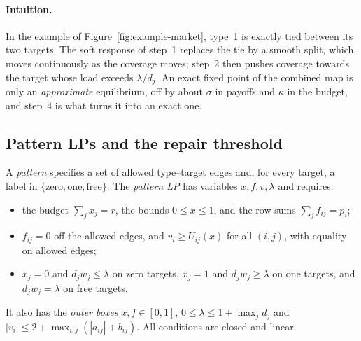 \paragraph{Intuition.} In the example of Figure~\ref{fig:example-market}, type~1 is exactly tied between
its two targets. The soft response of step~1 replaces the tie by a smooth split, which moves continuously
as the coverage moves; step~2 then pushes coverage towards the target whose load exceeds $\lambda/d_j$.
An exact fixed point of the combined map is only an \emph{approximate} equilibrium, off by about $\sigma$
in payoffs and $\kappa$ in the budget, and step~4 is what turns it into an exact one.

\subsection{Pattern LPs and the repair threshold}

A \emph{pattern} specifies a set of allowed type--target edges and, for every target, a label in
$\{\text{zero},\text{one},\text{free}\}$. The \emph{pattern LP} has variables $x,f,v,\lambda$ and
requires:
\begin{itemize}[nosep]
  \item the budget $\sum_jx_j=r$, the bounds $0\le x\le1$, and the row sums $\sum_jf_{ij}=p_i$;
  \item $f_{ij}=0$ off the allowed edges, and $v_i\ge U_{ij}(x)$ for all $(i,j)$, with equality on
        allowed edges;
  \item $x_j=0$ and $d_jw_j\le\lambda$ on zero targets, $x_j=1$ and $d_jw_j\ge\lambda$ on one targets,
        and $d_jw_j=\lambda$ on free targets.
\end{itemize}
It also has the \emph{outer boxes} $x,f\in[0,1]$, $0\le\lambda\le1+\max_jd_j$ and
$|v_i|\le2+\max_{i,j}(|a_{ij}|+b_{ij})$. All conditions are closed and linear.

